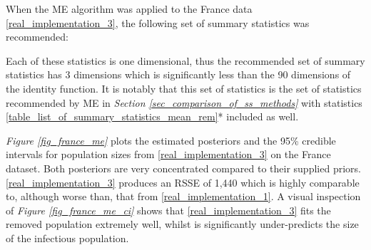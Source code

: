 \documentclass[11pt,a4paper]{article}
\theoremstyle{break}
\begin{document}
  When the ME algorithm was applied to the France data \noindent\ref{real_implementation_3}, the following set of summary statistics was recommended:

  \begin{center}
  \end{center}
  \noindent Each of these statistics is one dimensional, thus the recommended set of summary statistics has 3 dimensions which is significantly less than the 90 dimensions of the identity function. It is notably that this set of statistics is the set of statistics recommended by ME in \textit{Section \ref{sec_comparison_of_ss_methods}} with statistics \ref{table_list_of_summary_statistics_mean_rem}* included as well.

  \par \textit{Figure \ref{fig_france_me}} plots the estimated posteriors and the 95\% credible intervals for population sizes from \ref{real_implementation_3} on the France dataset. Both posteriors are very concentrated compared to their supplied priors. \ref{real_implementation_3} produces an RSSE of 1,440 which is highly comparable to, although worse than, that from \ref{real_implementation_1}. A visual inspection of \textit{Figure \ref{fig_france_me_ci}} shows that \ref{real_implementation_3} fits the removed population extremely well, whilst is significantly under-predicts the size of the infectious population.
\end{document}

